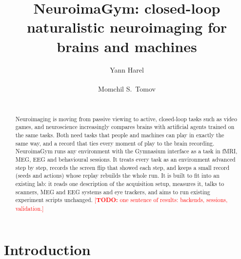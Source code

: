 \documentclass{article}
\title{NeuroimaGym: closed-loop naturalistic neuroimaging for brains and machines}
\author{
  Yann Harel\\
  \TODO{affiliation}
  \And
  \TODO{the contributors}\\
  \TODO{affiliations}
  \And
  Momchil S.~Tomov\\
  \TODO{affiliation}\\
  \TODO{corresponding author}
}
\newcommand{\TODO}[1]{\textcolor{red}{[\textbf{TODO:} #1]}}
\begin{document}
\maketitle

\begin{abstract}
Neuroimaging is moving from passive viewing to active, closed-loop tasks such as video games, and neuroscience increasingly compares brains with artificial agents trained on the same tasks.
Both need tasks that people and machines can play in exactly the same way, and a record that ties every moment of play to the brain recording.
NeuroimaGym runs any environment with the Gymnasium interface as a task in fMRI, MEG, EEG and behavioural sessions.
It treats every task as an environment advanced step by step, records the screen flip that showed each step, and keeps a small record (seeds and actions) whose replay rebuilds the whole run.
It is built to fit into an existing lab: it reads one description of the acquisition setup, measures it, talks to scanners, MEG and EEG systems and eye trackers, and aims to run existing experiment scripts unchanged.
\TODO{one sentence of results: backends, sessions, validation.}
\end{abstract}

\section{Introduction}
\label{sec:introduction}
\end{document}
